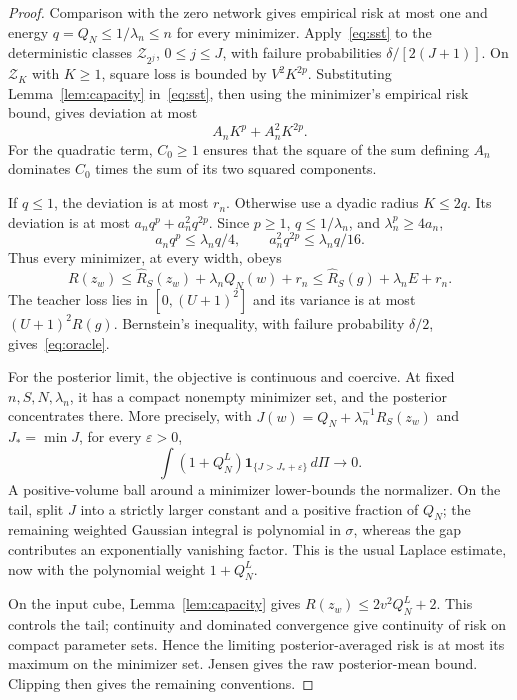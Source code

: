 \documentclass[11pt]{article}
\theoremstyle{remark}\newtheorem{remark}[theorem]{Remark}
\newcommand{\Risk}{R}\newcommand{\empRisk}{\widehat R}
\newcommand{\Ind}{\mathbf 1}
\begin{document}
\begin{proof}
Comparison with the zero network gives empirical risk at most one and energy $q=Q_N\le1/\lambda_n\le n$ for every minimizer. Apply~\eqref{eq:sst} to the deterministic classes $\mathcal Z_{2^j}$, $0\le j\le J$, with failure probabilities $\delta/[2(J+1)]$. On $\mathcal Z_K$ with $K\ge1$, square loss is bounded by $V^2K^{2p}$. Substituting Lemma~\ref{lem:capacity} in~\eqref{eq:sst}, then using the minimizer's empirical risk bound, gives deviation at most
\[
 A_nK^p+A_n^2K^{2p}.
\]
For the quadratic term, $C_0\ge1$ ensures that the square of the sum defining $A_n$ dominates $C_0$ times the sum of its two squared components.

If $q\le1$, the deviation is at most $r_n$. Otherwise use a dyadic radius $K\le2q$. Its deviation is at most $a_nq^p+a_n^2q^{2p}$. Since $p\ge1$, $q\le1/\lambda_n$, and $\lambda_n^p\ge4a_n$,
\[
 a_nq^p\le\lambda_nq/4,\qquad
 a_n^2q^{2p}\le\lambda_nq/16.
\]
Thus every minimizer, at every width, obeys
\[
 \Risk(z_w)\le\empRisk_S(z_w)+\lambda_nQ_N(w)+r_n
             \le\empRisk_S(g)+\lambda_nE+r_n.
\]
The teacher loss lies in $[0,(U+1)^2]$ and its variance is at most $(U+1)^2\Risk(g)$. Bernstein's inequality, with failure probability $\delta/2$, gives~\eqref{eq:oracle}.

For the posterior limit, the objective is continuous and coercive. At fixed $n,S,N,\lambda_n$, it has a compact nonempty minimizer set, and the posterior concentrates there. More precisely, with $J(w)=Q_N+\lambda_n^{-1}\empRisk_S(z_w)$ and $J_* =\min J$, for every $\varepsilon>0$,
\[
 \int(1+Q_N^L)\Ind_{\{J>J_*+\varepsilon\}}\,d\Pi\longrightarrow0.
\]
A positive-volume ball around a minimizer lower-bounds the normalizer. On the tail, split $J$ into a strictly larger constant and a positive fraction of $Q_N$; the remaining weighted Gaussian integral is polynomial in $\sigma$, whereas the gap contributes an exponentially vanishing factor. This is the usual Laplace estimate, now with the polynomial weight $1+Q_N^L$.

On the input cube, Lemma~\ref{lem:capacity} gives
$\Risk(z_w)\le2v^2Q_N^L+2$. This controls the tail; continuity and dominated convergence give continuity of risk on compact parameter sets. Hence the limiting posterior-averaged risk is at most its maximum on the minimizer set. Jensen gives the raw posterior-mean bound. Clipping then gives the remaining conventions.
\end{proof}
\end{document}
